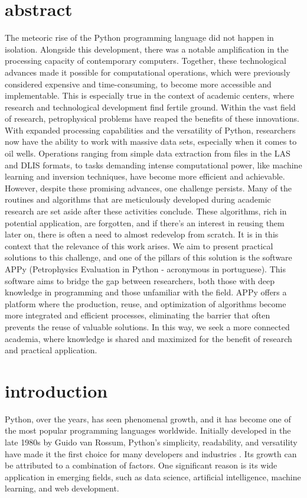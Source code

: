 \documentclass[10pt,twocolumn,twoside]{article}
\begin{document}
\section{abstract}
The meteoric rise of the Python programming language did not happen in isolation. Alongside this development, there was a notable amplification in the processing capacity of contemporary computers. Together, these technological advances made it possible for computational operations, which were previously considered expensive and time-consuming, to become more accessible and implementable. This is especially true in the context of academic centers, where research and technological development find fertile ground. Within the vast field of research, petrophysical problems have reaped the benefits of these innovations. With expanded processing capabilities and the versatility of Python, researchers now have the ability to work with massive data sets, especially when it comes to oil wells. Operations ranging from simple data extraction from files in the LAS and DLIS formats, to tasks demanding intense computational power, like machine learning and inversion techniques, have become more efficient and achievable. However, despite these promising advances, one challenge persists. Many of the routines and algorithms that are meticulously developed during academic research are set aside after these activities conclude. These algorithms, rich in potential application, are forgotten, and if there's an interest in reusing them later on, there is often a need to almost redevelop from scratch. It is in this context that the relevance of this work arises. We aim to present practical solutions to this challenge, and one of the pillars of this solution is the software APPy (Petrophysics Evaluation in Python - acronymous in portuguese). This software aims to bridge the gap between researchers, both those with deep knowledge in programming and those unfamiliar with the field. APPy offers a platform where the production, reuse, and optimization of algorithms become more integrated and efficient processes, eliminating the barrier that often prevents the reuse of valuable solutions. In this way, we seek a more connected academia, where knowledge is shared and maximized for the benefit of research and practical application.


\section{introduction}
Python, over the years, has seen phenomenal growth, and it has become one of the most popular programming languages worldwide. Initially developed in the late 1980s by Guido van Rossum, Python's simplicity, readability, and versatility have made it the first choice for many developers and industries \citep{pysftw2021}. Its growth can be attributed to a combination of factors. One significant reason is its wide application in emerging fields, such as data science, artificial intelligence, machine learning, and web development.
\end{document}
